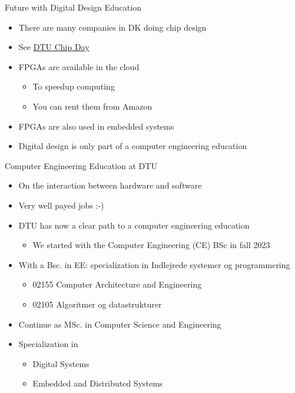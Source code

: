 \begin{frame}[fragile]{Future with Digital Design Education}
\begin{itemize}
\item There are many companies in DK doing chip design
\item See \href{https://chipday.dk/}{DTU Chip Day}
\item FPGAs are available in the cloud
\begin{itemize}
\item To speedup computing
\item You can rent them from Amazon
\end{itemize}
\item FPGAs are also used in embedded systems
\item Digital design is only part of a computer engineering education
\end{itemize}
\end{frame}



\begin{frame}[fragile]{Computer Engineering Education at DTU}
\begin{itemize}
\item On the interaction between hardware and software
\item Very well payed jobs :-)
\item DTU has now a clear path to a computer engineering education
\begin{itemize}
\item We started with the Computer Engineering (CE) BSc in fall 2023
\end{itemize}
\item With a Bsc. in EE: specialization in Indlejrede systemer og programmering
\begin{itemize}
\item 02155 Computer Architecture and Engineering
\item 02105 Algoritmer og datastrukturer
\end{itemize}
\item Continue as MSc. in Computer Science and Engineering
\item Specialization in
\begin{itemize}
\item Digital Systems
\item Embedded and Distributed Systems
\end{itemize}
\end{itemize}
\end{frame}

